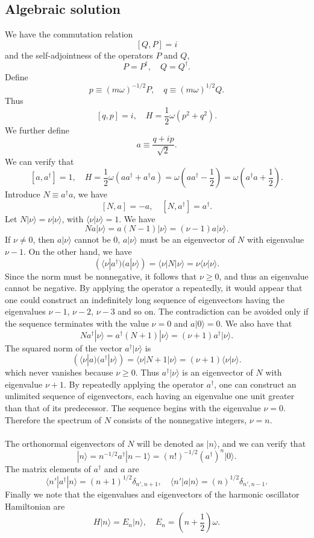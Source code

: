 \subsection{Algebraic solution}
We have the commutation relation
\[[Q,P] = i\]
and the self-adjointness of the operators $P$ and $Q$,
\[P = P^{\dagger} , \quad Q = Q^{\dagger}.\]
Define
\[ p \equiv (m\omega)^{-1/2}P , \quad q \equiv (m\omega)^{1/2}Q.\]
Thus
\[[q,p] = i , \quad H = \frac{1}{2}\omega(p^2+q^2).\]
We further define
\[a \equiv \frac{q+ip}{\sqrt{2}}.\]
We can verify that
\[[a,a^{\dagger}] = 1 , \quad H = \frac{1}{2}\omega(aa^{\dagger}+a^{\dagger}a) = \omega(aa^{\dagger}-\frac{1}{2}) = \omega(a^{\dagger}a+\frac{1}{2}).\]
Introduce $N \equiv a^{\dagger}a$, we have
\[[N,a] = -a , \quad [N,a^{\dagger}] = a^{\dagger}.\]
Let $N|\nu\rangle = \nu|\nu\rangle $, with $\langle \nu | \nu \rangle = 1$. We have
\[Na|\nu\rangle = a(N-1)|\nu\rangle = (\nu-1)a|\nu\rangle.\]
If $\nu \neq 0$, then $a|\nu\rangle$ cannot be $0$, $a|\nu\rangle$ must be an eigenvector of $N$ with eigenvalue $\nu - 1$.
On the other hand, we have
\[(\langle \nu | a^{\dagger})(a|\nu\rangle) = \langle \nu | N | \nu \rangle = \nu \langle \nu | \nu \rangle.\]
Since the norm must be nonnegative, it follows that $\nu \geq 0$, and thus an eigenvalue cannot be negative. By applying the operator a repeatedly, it would appear that one could construct an indefinitely long sequence of eigenvectors
having the eigenvalues $\nu-1$, $\nu-2$, $\nu-3$ and so on.
The contradiction can be avoided only if the sequence terminates with the value $\nu=0$ and $a|0\rangle = 0$.
We also have that
\[Na^{\dagger}|\nu\rangle = a^{\dagger}(N+1)|\nu\rangle = (\nu+1)a^{\dagger}|\nu\rangle.\]
The squared norm of the vector $a^{\dagger} |\nu\rangle$ is
\[(\langle \nu | a)(a^{\dagger} | \nu \rangle)= \langle \nu | N+1|\nu\rangle = (\nu+1) \langle \nu | \nu \rangle .\]
which never vanishes because $\nu \geq 0$. Thus $a^{\dagger} | \nu \rangle$ is an eigenvector of $N$ with eigenvalue $\nu+1$. By repeatedly applying the operator $a^{\dagger}$, one can construct an unlimited sequence of eigenvectors, each having an eigenvalue one unit greater than that of its predecessor. The sequence begins with the eigenvalue $\nu=0$.
Therefore the spectrum of $N$ consists of the nonnegative integers, $\nu=n$. 
\\ \\
The orthonormal eigenvectors of $N$ will be denoted as $|n\rangle$, and we can verify that
\[ |n\rangle = n^{-1/2} a^{\dagger} |n-1\rangle = (n!)^{-1/2} (a^{\dagger})^n |0\rangle.\]
The matrix elements of $a^{\dagger}$ and $a$ are
\[\langle n' | a^{\dagger} |n \rangle = (n+1)^{1/2}\delta_{n',n+1} , \quad  \langle n' | a |n \rangle = (n)^{1/2}\delta_{n',n-1}.\]
Finally we note that the eigenvalues and eigenvectors of the harmonic oscillator Hamiltonian are
\[H |n\rangle = E_n |n\rangle , \quad  E_n =(n+\frac{1}{2})\omega.\]

